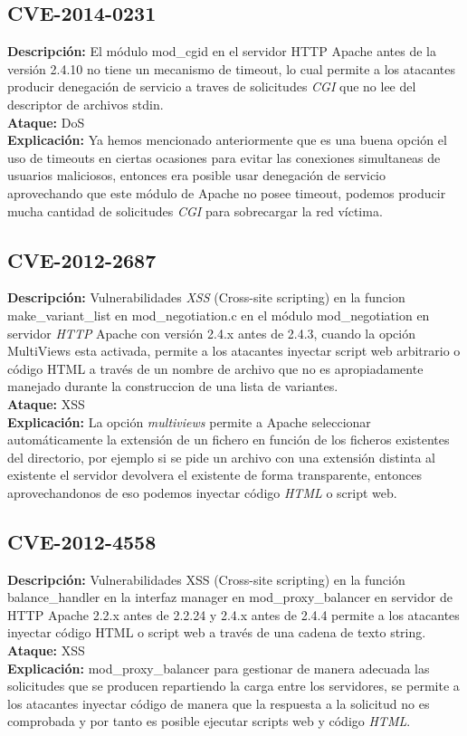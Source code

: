 \documentclass[a4paper, 10pt]{article} %
\begin{document}
\subsection{CVE-2014-0231}
\textbf{Descripción:} El módulo mod\_cgid en el servidor HTTP Apache antes de la versión 2.4.10 no tiene un mecanismo de timeout, lo cual permite a los atacantes producir denegación de servicio a traves de solicitudes \textit{CGI} que no lee del descriptor de archivos stdin.\\
\textbf{Ataque:} DoS\\
\textbf{Explicación:} Ya hemos mencionado anteriormente que es una buena opción el uso de timeouts en ciertas ocasiones para evitar las conexiones simultaneas de usuarios maliciosos, entonces era posible usar denegación de servicio aprovechando que este módulo de Apache no posee timeout, podemos producir mucha cantidad de solicitudes \textit{CGI} para sobrecargar la red víctima.
\subsection{CVE-2012-2687}
\textbf{Descripción:} Vulnerabilidades \textit{XSS} (Cross-site scripting) en la funcion make\_variant\_list en mod\_negotiation.c en el módulo mod\_negotiation en servidor \textit{HTTP} Apache con versión 2.4.x antes de 2.4.3, cuando la opción MultiViews esta activada, permite a los atacantes inyectar script web arbitrario o código HTML a través de un nombre de archivo que no es apropiadamente manejado durante la construccion de una lista de variantes.\\
\textbf{Ataque:} XSS\\
\textbf{Explicación:} La opción \textit{multiviews} permite a Apache seleccionar automáticamente la extensión de un fichero en función de los ficheros existentes del directorio, por ejemplo si se pide un archivo con una extensión distinta al existente el servidor devolvera el existente de forma transparente, entonces aprovechandonos de eso podemos inyectar código \textit{HTML} o script web.
\subsection{CVE-2012-4558}
\textbf{Descripción:} Vulnerabilidades XSS (Cross-site scripting) en la función balance\_handler en la interfaz manager en mod\_proxy\_balancer en servidor de HTTP Apache 2.2.x antes de 2.2.24 y 2.4.x antes de 2.4.4 permite a los atacantes inyectar código HTML o script web a través de una cadena de texto string.\\
\textbf{Ataque:} XSS\\
\textbf{Explicación:} mod\_proxy\_balancer para gestionar de manera adecuada las solicitudes que se producen repartiendo la carga entre los servidores, se permite a los atacantes inyectar código de manera que la respuesta a la solicitud no es comprobada y por tanto es posible ejecutar scripts web y código \textit{HTML}.
\end{document}
